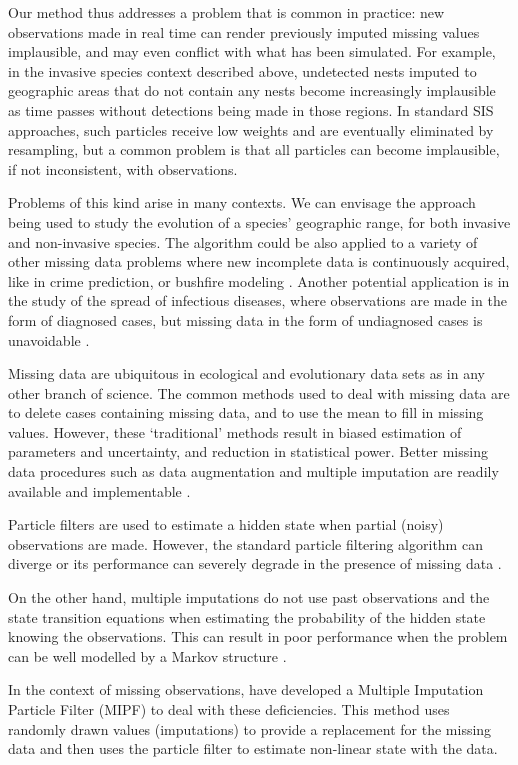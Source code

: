 Our method thus addresses a problem that is common in practice: new observations made in real time can render previously imputed missing values implausible, and may even conflict with what has been simulated. For example, in the invasive species context described above, undetected nests imputed to geographic areas that do not contain any nests become increasingly implausible as time passes without detections being made in those regions. In standard SIS approaches, such particles receive low weights and are eventually eliminated by resampling, but a common problem is that all particles can become implausible, if not inconsistent, with observations.

Problems of this kind arise in many contexts. {\color{red} We can envisage the approach being used to study the evolution of a species' geographic range, for both invasive and non-invasive species. The algorithm could be also applied to a variety of other missing data problems where new incomplete data is continuously acquired, like in crime prediction, \cite{Malathy} or bushfire modeling \cite{Beer}.} Another potential application is in the study of the spread of infectious diseases, where observations are made in the form of diagnosed cases, but missing data in the form of undiagnosed cases is unavoidable \cite{O'Neill}. 


Missing data are ubiquitous in ecological and evolutionary data sets as in any other branch of science. The common methods used to deal with missing data are to delete cases containing missing data, and to use the mean to fill in missing values. However, these ‘traditional’ methods result in biased estimation of parameters and uncertainty, and reduction in statistical power. Better missing data procedures such as data augmentation \cite{Tanner} and multiple imputation \cite{RubinMI} are readily available and implementable \cite{Nakagawa}.

Particle filters are used to estimate a hidden state when partial (noisy) observations are made. However, the standard particle filtering algorithm can diverge or its performance can severely degrade in the presence of missing data \cite{Zhang}.

On the other hand, multiple imputations do not use past observations and the state transition equations when estimating the probability of the hidden state knowing the observations. This can result in poor performance when the problem can be well modelled by a Markov structure \cite{Zhang}.

In the context of missing observations, \cite{Zhang} have developed a Multiple Imputation Particle Filter (MIPF) to deal with these deficiencies. This method uses randomly drawn values (imputations) to provide a replacement for the missing data and then uses the particle filter to estimate non-linear state with the data.

